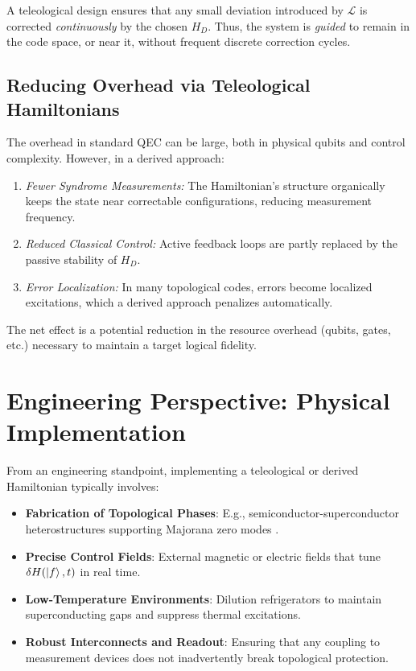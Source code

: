 \documentclass[11pt]{article}
\begin{document}
A teleological design ensures that any small deviation introduced by $\mathcal{L}$ is corrected \emph{continuously} by the chosen $H_D$. Thus, the system is \emph{guided} to remain in the code space, or near it, without frequent discrete correction cycles.

\subsection{Reducing Overhead via Teleological Hamiltonians}
The overhead in standard QEC can be large, both in physical qubits and control complexity. However, in a derived approach:
\begin{enumerate}[(1)]
\item \emph{Fewer Syndrome Measurements:} The Hamiltonian’s structure organically keeps the state near correctable configurations, reducing measurement frequency.
\item \emph{Reduced Classical Control:} Active feedback loops are partly replaced by the passive stability of $H_D$.
\item \emph{Error Localization:} In many topological codes, errors become localized excitations, which a derived approach penalizes automatically. 
\end{enumerate}

The net effect is a potential reduction in the resource overhead (qubits, gates, etc.) necessary to maintain a target logical fidelity.

\section{Engineering Perspective: Physical Implementation}
From an engineering standpoint, implementing a teleological or derived Hamiltonian typically involves:
\begin{itemize}
\item \textbf{Fabrication of Topological Phases}: E.g., semiconductor-superconductor heterostructures supporting Majorana zero modes \cite{Lutchyn2018}.
\item \textbf{Precise Control Fields}: External magnetic or electric fields that tune $\delta H(\ket{f}, t)$ in real time.
\item \textbf{Low-Temperature Environments}: Dilution refrigerators to maintain superconducting gaps and suppress thermal excitations.
\item \textbf{Robust Interconnects and Readout}: Ensuring that any coupling to measurement devices does not inadvertently break topological protection.
\end{itemize}
\end{document}
